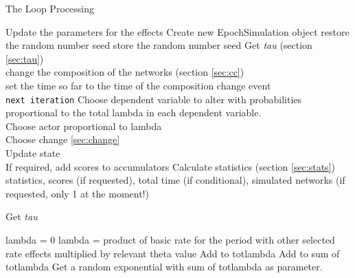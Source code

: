\documentclass[12pt,a4paper]{article}
\makeatletter
\renewcommand{\=}{\,=\,}
\newcommand{\+}{\,+\,}
\newcommand{\nnm}[1]{\textsf{\small\textit{#1}}}
\renewcommand{\section}{\@startsection{section}{1}
                {0pt}{\baselineskip}{0.5\baselineskip}
                {\centering\sffamily} }
\renewcommand{\subsection}{\@startsection{subsection}{2}
                {0pt}{0.7\baselineskip}{0.3\baselineskip}
                {\sffamily} }
\makeatother
\begin{document}
\section{The Loop Processing}
\begin{algorithmic}
\STATE Update the parameters for the effects
\STATE Create new EpochSimulation object
\STATE restore the random number seed
\ELSE
\STATE store the random number seed
\ENDIF
\REPEAT
\STATE Get \nnm{tau} (section \ref{sec:tau})\\
\STATE change the composition of the networks (section \ref{sec:cc})\\
set the time so far to the time of the composition change event\\
\texttt{next iteration}
\ENDIF
\STATE Choose dependent variable to alter with probabilities
proportional to the total lambda in each dependent variable.\\
\STATE Choose actor proportional to lambda\\
Choose change \ref{sec:change}\\
Update state\\
If required, add scores to accumulators
\STATE Calculate statistics (section \ref{sec:stats})
\ENDFOR
\ENDFOR
\RETURN statistics, scores (if requested), total time (if conditional),
simulated networks (if requested, only 1 at the moment!)
\end{algorithmic}
\subsection{Get \nnm{tau}}
\label{sec:tau}
\begin{algorithmic}
\STATE lambda = 0
\ELSE
\STATE lambda = product of basic rate for the period with other
selected rate effects multiplied by relevant theta value
\ENDIF
\STATE Add to totlambda
\ENDFOR
\STATE Add to sum of totlambda
\ENDFOR
\STATE Get a random exponential with sum of totlambda as parameter.\\
\end{algorithmic}
\end{document}

